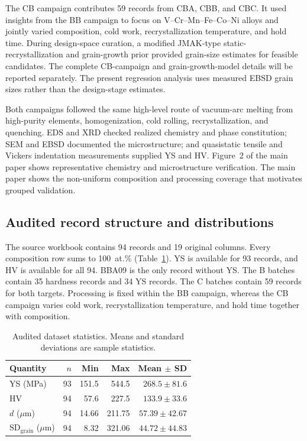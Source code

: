 \documentclass[a4paper,11pt]{article}
\begin{document}
The CB campaign contributes 59 records from CBA, CBB, and CBC. It used insights from the BB campaign to focus on V--Cr--Mn--Fe--Co--Ni alloys and jointly varied composition, cold work, recrystallization temperature, and hold time. During design-space curation, a modified JMAK-type static-recrystallization and grain-growth prior provided grain-size estimates for feasible candidates. The complete CB-campaign and grain-growth-model details will be reported separately. The present regression analysis uses measured EBSD grain sizes rather than the design-stage estimates.

Both campaigns followed the same high-level route of vacuum-arc melting from high-purity elements, homogenization, cold rolling, recrystallization, and quenching. EDS and XRD checked realized chemistry and phase constitution; SEM and EBSD documented the microstructure; and quasistatic tensile and Vickers indentation measurements supplied YS and HV. Figure~2 of the main paper shows representative chemistry and microstructure verification. The main paper shows the non-uniform composition and processing coverage that motivates grouped validation.

\subsection{Audited record structure and distributions}

The source workbook contains 94 records and 19 original columns. Every composition row sums to 100~at.\% (Table~\ref{tab:data}). YS is available for 93 records, and HV is available for all 94. BBA09 is the only record without YS. The B batches contain 35 hardness records and 34 YS records. The C batches contain 59 records for both targets. Processing is fixed within the BB campaign, whereas the CB campaign varies cold work, recrystallization temperature, and hold time together with composition.

\begin{table}[H]
\centering
\caption{Audited dataset statistics. Means and standard deviations are sample statistics.}
\label{tab:data}
\begin{tabular}{lrrrr}
\toprule
Quantity & $n$ & Min & Max & Mean $\pm$ SD \\
\midrule
YS (MPa) & 93 & 151.5 & 544.5 & $268.5\pm81.6$ \\
HV & 94 & 57.6 & 227.5 & $133.9\pm33.6$ \\
$d$ ($\mu$m) & 94 & 14.66 & 211.75 & $57.39\pm42.67$ \\
$\mathrm{SD}_{\mathrm{grain}}$ ($\mu$m) & 94 & 8.32 & 321.06 & $44.72\pm44.83$ \\
\bottomrule
\end{tabular}
\end{table}
\end{document}
